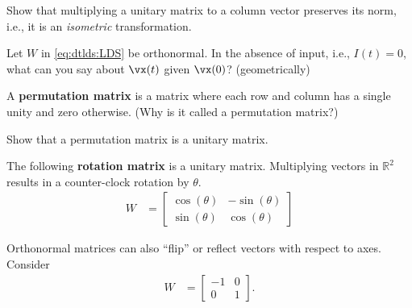 \documentclass[a4paper,11pt]{exam}
\newcounter{ct}
\newcommand{\inv}{^{-1}}
\newcommand{\ctrp}{{^\dagger}} %
\newcommand{\field}[1]{\ensuremath{\mathbb{#1}}}
\newcommand{\reals}{\field{R}}
\begin{document}
\begin{questions}
\question Show that multiplying a unitary matrix to a column vector preserves its norm, i.e., it is an \emph{isometric} transformation.

\question Let $W$ in \eqref{eq:dtlds:LDS} be orthonormal. In the absence of input, i.e., $I(t) = 0$, what can you say about $\vx(t)$ given $\vx(0)$? (geometrically)

A \textbf{permutation matrix} is a matrix where each row and column has a single unity and zero otherwise. (Why is it called a permutation matrix?)

\question Show that a permutation matrix is a unitary matrix.


\clearpage
\question The following \textbf{rotation matrix} is a unitary matrix. Multiplying vectors in $\reals^2$ results in a counter-clock rotation by $\theta$.
\begin{align}\label{eq:LA:rotation}
    W &=
    \begin{bmatrix}
	\cos(\theta) & -\sin(\theta)\\
	\sin(\theta) & \cos(\theta)
    \end{bmatrix}
\end{align}

\question Orthonormal matrices can also ``flip'' or reflect vectors with respect to axes. Consider
\begin{align}\label{eq:LA:flip}
    W &=
    \begin{bmatrix}
	-1 & 0\\
	 0 & 1
    \end{bmatrix}.
\end{align}
\begin{parts}

\end{parts}
\end{questions}
\end{document}
